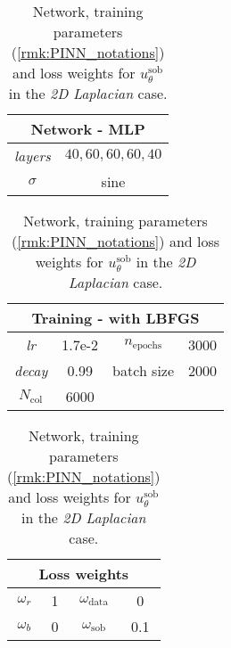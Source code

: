 \begin{table}[htbp]
    \centering
    \begin{tabular}{cc}
        \toprule
        \multicolumn{2}{c}{\textbf{Network - MLP}} \\
        \midrule
        \textit{layers} & $40,60,60,60,40$ \\
        \cmidrule(lr){1-2}
        $\sigma$ & sine \\
        \bottomrule
    \end{tabular}
    \hspace{1cm}
    \begin{tabular}{cccc}
        \toprule
        \multicolumn{4}{c}{\textbf{Training - with LBFGS}} \\
        \midrule
        \textit{lr} & 1.7e-2 & $n_\text{epochs}$ & 3000 \\
        \cmidrule(lr){1-2} \cmidrule(lr){3-4}
        \textit{decay} & 0.99 & batch size & 2000 \\
        \cmidrule(lr){1-2} \cmidrule(lr){3-4}
        $N_\text{col}$ & 6000 \\
        \bottomrule
    \end{tabular}
    \hspace{1cm}
    \begin{tabular}{cccc}
        \toprule
        \multicolumn{4}{c}{\textbf{Loss weights}} \\
        \midrule
        $\omega_r$ & 1 & $\omega_\text{data}$ & 0 \\
        \cmidrule(lr){1-2} \cmidrule(lr){3-4}
        $\omega_b$ & 0 & $\omega_\text{sob}$ & 0.1 \\        
        \bottomrule
    \end{tabular}
    \caption{Network, training parameters (\cref{rmk:PINN_notations}) and loss weights for $u_\theta^\text{sob}$ in the \textit{2D Laplacian} case.}
    \label{tab:paramtest1v7_2D}
\end{table}
